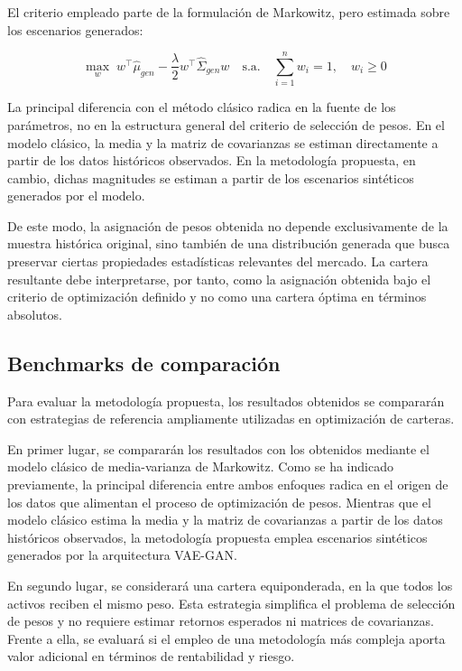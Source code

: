 El criterio empleado parte de la formulación de Markowitz, pero estimada sobre los escenarios generados:

\begin{equation}
\max_{w}
\; w^{\top}\hat{\mu}_{gen}
-
\frac{\lambda}{2}
w^{\top}\hat{\Sigma}_{gen}w
\quad
\text{s.a.}
\quad
\sum_{i=1}^{n} w_i = 1,
\quad
w_i \geq 0
\end{equation}

La principal diferencia con el método clásico radica en la fuente de los parámetros, no en la estructura general del criterio de selección de pesos. En el modelo clásico, la media y la matriz de covarianzas se estiman directamente a partir de los datos históricos observados. En la metodología propuesta, en cambio, dichas magnitudes se estiman a partir de los escenarios sintéticos generados por el modelo.

De este modo, la asignación de pesos obtenida no depende exclusivamente de la muestra histórica original, sino también de una distribución generada que busca preservar ciertas propiedades estadísticas relevantes del mercado. La cartera resultante debe interpretarse, por tanto, como la asignación obtenida bajo el criterio de optimización definido y no como una cartera óptima en términos absolutos.

\subsection{Benchmarks de comparación}

Para evaluar la metodología propuesta, los resultados obtenidos se compararán con estrategias de referencia ampliamente utilizadas en optimización de carteras.

En primer lugar, se compararán los resultados con los obtenidos mediante el modelo clásico de media-varianza de Markowitz. Como se ha indicado previamente, la principal diferencia entre ambos enfoques radica en el origen de los datos que alimentan el proceso de optimización de pesos. Mientras que el modelo clásico estima la media y la matriz de covarianzas a partir de los datos históricos observados, la metodología propuesta emplea escenarios sintéticos generados por la arquitectura VAE-GAN.

En segundo lugar, se considerará una cartera equiponderada, en la que todos los activos reciben el mismo peso. Esta estrategia simplifica el problema de selección de pesos y no requiere estimar retornos esperados ni matrices de covarianzas. Frente a ella, se evaluará si el empleo de una metodología más compleja aporta valor adicional en términos de rentabilidad y riesgo.

